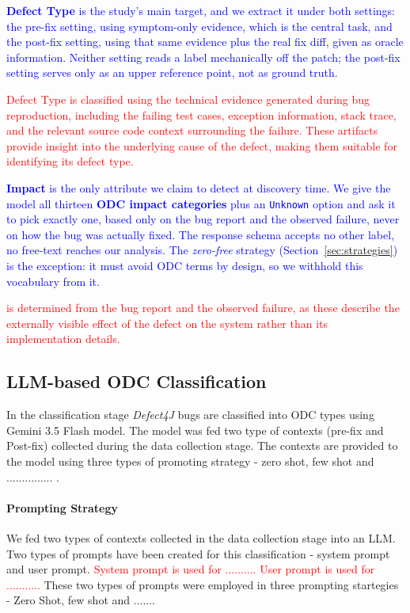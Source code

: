 \textcolor{blue}{
\textbf{Defect Type} is the study's main target, and we extract it under both
settings: the pre-fix setting, using symptom-only evidence, which is the central
task, and the post-fix setting, using that same evidence plus the real fix diff,
given as oracle information. Neither setting reads a label mechanically off the
patch; the post-fix setting serves only as an upper reference point, not as
ground truth.}

\textcolor{red}{Defect Type is classified using the technical evidence generated during bug reproduction, including the failing test cases, exception information, stack trace, and the relevant source code context surrounding the failure. These artifacts provide insight into the underlying cause of the defect, making them suitable for identifying its defect type.}

\textcolor{blue}{
\textbf{Impact} is the only attribute we claim to detect at discovery time. We
give the model all thirteen \textbf{ODC impact categories} plus an \texttt{Unknown} option
and ask it to pick exactly one, based only on the bug report and the observed
failure, never on how the bug was actually fixed. The response schema accepts no
other label, no free-text reaches our analysis. The \textit{zero-free}
strategy (Section~\ref{sec:strategies}) is the exception: it must avoid ODC terms
by design, so we withhold this vocabulary from it.}

\textcolor{red}{is determined from the bug report and the observed failure, as these describe the externally visible effect of the defect on the system rather than its implementation details.}

\subsection{LLM-based ODC Classification}
\label{subsec:classification}
In the classification stage \textit{Defect4J} bugs are classified into ODC types using Gemini 3.5 Flash model. The model was fed two type of contexts (pre-fix and Post-fix) collected during the data collection stage. The contexts are provided to the model using three types of promoting strategy - zero shot, few shot and ............... . 

\paragraph{Prompting Strategy} We fed two types of contexts collected in the data collection stage into an LLM. Two types of prompts have been created for this classification - system prompt and user prompt. \textcolor{red}{System prompt is used for .......... User prompt is used for ...........} These two types of prompts were employed in three prompting startegies - Zero Shot, few shot and .......

